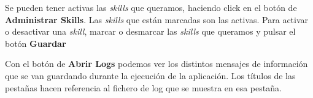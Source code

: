  

Se pueden tener activas las \textit{skills} que queramos, haciendo click en el botón de \textbf{Administrar Skills}. Las \textit{skills} que están marcadas son las activas. Para activar o desactivar una \textit{skill}, marcar o desmarcar las \textit{skills} que queramos y pulsar el botón \textbf{Guardar}


Con el botón de \textbf{Abrir Logs} podemos ver los distintos mensajes de información que se van guardando durante la ejecución de la aplicación. Los títulos de las pestañas hacen referencia al fichero de log que se muestra en esa pestaña.

